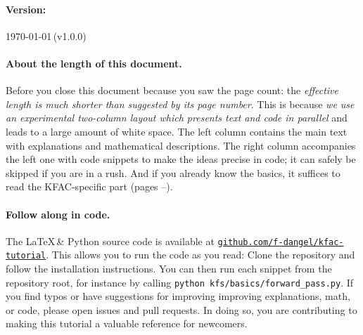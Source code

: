 \vfill

\paragraph{Version:} \today\,(v1.0.0)

\paragraph{About the length of this document.}
Before you close this document because you saw the page count:
the \emph{effective length is much shorter than suggested by its page number}.
This is because \emph{we use an experimental two-column layout which presents text and code in parallel} and leads to a large amount of white space.
The left column contains the main text with explanations and mathematical descriptions.
The right column accompanies the left one with code snippets to make the ideas precise in code; it can safely be skipped if you are in a rush.
And if you already know the basics, it suffices to read the KFAC-specific part (pages \pageref{sec:kfac-overview}--\pageref{sec:kfac-cheatsheet}).

\paragraph{Follow along in code.} The \LaTeX\,\& Python source code is available at \href{\repourl}{\texttt{github.com/f-dangel/kfac-tutorial}}.
This allows you to run the code as you read:
Clone the repository and follow the installation instructions.
You can then run each snippet from the repository root, for instance by calling \texttt{python kfs/basics/forward\_pass.py}.
If you find typos or have suggestions for improving improving explanations, math, or code, please open issues and pull requests.
In doing so, you are contributing to making this tutorial a valuable reference for newcomers.

\vspace{\baselineskip}
